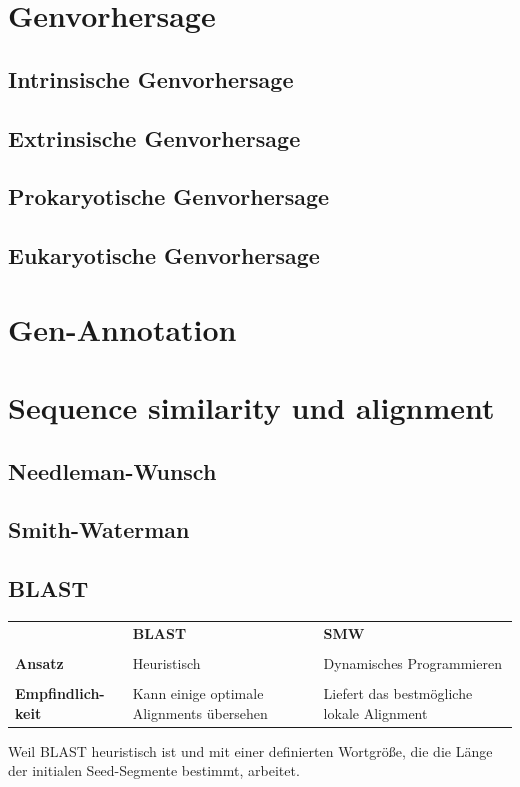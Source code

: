 \section{Genvorhersage}
\subsection{Intrinsische Genvorhersage}
\subsection{Extrinsische Genvorhersage}
\subsection{Prokaryotische Genvorhersage}
\subsection{Eukaryotische Genvorhersage}

\section{Gen-Annotation}

\section{Sequence similarity und alignment}
\subsection{Needleman-Wunsch}
\subsection{Smith-Waterman}
\subsection{BLAST}

\begin{mechanism}[title=Unterschied von BLAST und Smith-(Waterman-Algorithmus?) erklären]
\begin{table}[H]
    \centering
    \begin{tabular}{p{2cm}p{6cm}p{6cm}}
         &  \textbf{BLAST} & \textbf{SMW}\\ \\
       \textbf{Ansatz}  & Heuristisch & Dynamisches Programmieren \\ \\
       \textbf{Empfindlich-keit} & Kann einige optimale Alignments übersehen & Liefert das bestmögliche lokale Alignment 
    \end{tabular}
\end{table}
\end{mechanism}
\begin{mechanism}[title=Wieso ist BLAST schneller als das Alignment nach W.?]
Weil BLAST heuristisch ist und mit einer definierten Wortgröße, die die Länge der initialen Seed-Segmente bestimmt, arbeitet.
\end{mechanism}

